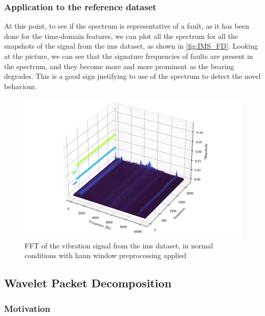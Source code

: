 \subsubsection{Application to the reference dataset}

At this point, to see if the spectrum is representative of a fault, as it has been done for the time-domain features, we can plot all the spectrum for all the snapshots of the  signal from the \gls{ims} dataset, as shown in \autoref{fig:IMS_FD}. Looking at the picture, we can see that the signature frequencies of faults are present in the spectrum, and they become more and more prominent as the bearing degrades. This is a good sign justifying to use of the spectrum to detect the novel behaviour.

\begin{figure}
    \centering
    \includegraphics[width=\textwidth]{images/FeatureExtraction/FD_IMS.png}
    \caption{FFT of the  vibration signal from the \gls{ims} dataset, in normal conditions with hann window preprocessing
    applied}
    \label{fig:IMS_FD}
\end{figure}


\subsection{Wavelet Packet Decomposition}
\label{sec:WPD}

\subsubsection{Motivation}

